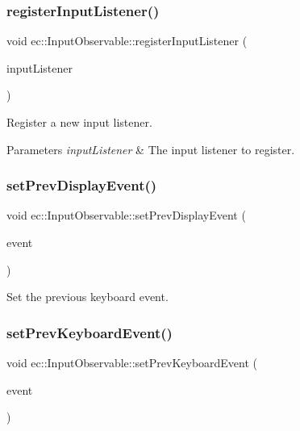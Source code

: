 \subsubsection{\texorpdfstring{register\+Input\+Listener()}{registerInputListener()}}
{\footnotesize\ttfamily void ec\+::\+Input\+Observable\+::register\+Input\+Listener (\begin{DoxyParamCaption}\item[{\mbox{\hyperlink{classec_1_1_input_listener}{Input\+Listener}} $\ast$}]{input\+Listener }\end{DoxyParamCaption})\hspace{0.3cm}{\ttfamily [virtual]}}



Register a new input listener. 


\begin{DoxyParams}{Parameters}
{\em input\+Listener} & The input listener to register. \\
\hline
\end{DoxyParams}
\mbox{\label{classec_1_1_input_observable_a55c7310a50dc873f69c2246bbeeed3e6}} 
\subsubsection{\texorpdfstring{set\+Prev\+Display\+Event()}{setPrevDisplayEvent()}}
{\footnotesize\ttfamily void ec\+::\+Input\+Observable\+::set\+Prev\+Display\+Event (\begin{DoxyParamCaption}\item[{const \mbox{\hyperlink{structec_1_1_display_event}{Display\+Event}} \&}]{event }\end{DoxyParamCaption})}



Set the previous keyboard event. 

\mbox{\label{classec_1_1_input_observable_afcc8abf8d747417f50465189e632d0dd}} 
\subsubsection{\texorpdfstring{set\+Prev\+Keyboard\+Event()}{setPrevKeyboardEvent()}}
{\footnotesize\ttfamily void ec\+::\+Input\+Observable\+::set\+Prev\+Keyboard\+Event (\begin{DoxyParamCaption}\item[{const \mbox{\hyperlink{structec_1_1_keyboard_event}{Keyboard\+Event}} \&}]{event }\end{DoxyParamCaption})}



